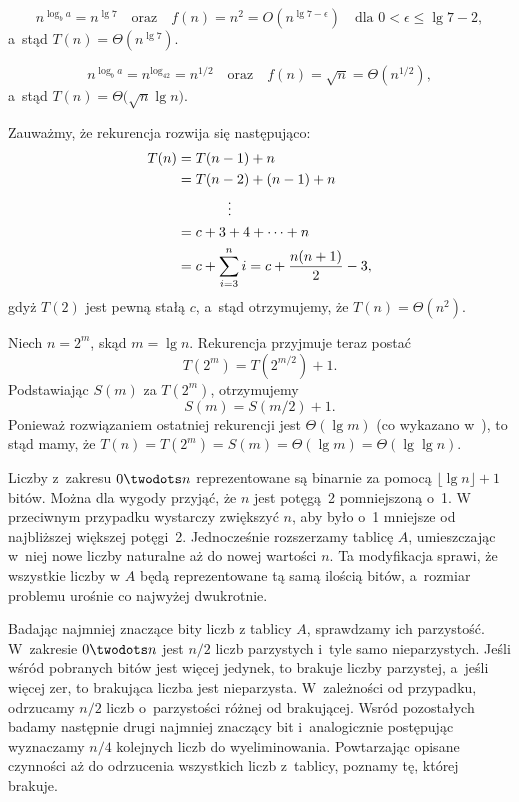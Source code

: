 \subproblem %
\[
	n^{\log_ba} = n^{\lg7} \quad\text{oraz}\quad f(n) = n^2 = O(n^{\lg7-\epsilon}) \quad\text{dla $0<\epsilon\le\lg7-2$},
\]
a~stąd $T(n)=\Theta(n^{\lg7})$.

\subproblem %
\[
	n^{\log_ba} = n^{\log_42} = n^{1/2} \quad\text{oraz}\quad f(n) = \sqrt{n} = \Theta(n^{1/2}),
\]
a~stąd $T(n)=\Theta\bigl(\!\sqrt{n}\lg n\bigr)$.

\subproblem %
Zauważmy, że rekurencja rozwija się następująco:
\begin{align*}
	T(n) &= T(n-1)+n \\
	&= T(n-2)+(n-1)+n \\
	&\hspace{.5in}\vdots \\
	&= c+3+4+\cdots+n \\
	&= c+\sum_{i=3}^ni = c+\frac{n(n+1)}{2}-3,
\end{align*}
gdyż $T(2)$ jest pewną stałą $c$, a~stąd otrzymujemy, że $T(n)=\Theta(n^2)$.

\subproblem %
Niech $n=2^m$, skąd $m=\lg n$. Rekurencja przyjmuje teraz postać
\[
	T(2^m) = T(2^{m/2})+1.
\]
Podstawiając $S(m)$ za $T(2^m)$, otrzymujemy
\[
	S(m) = S(m/2)+1.
\]
Ponieważ rozwiązaniem ostatniej rekurencji jest $\Theta(\lg m)$ (co wykazano w~), to stąd mamy, że $T(n)=T(2^m)=S(m)=\Theta(\lg m)=\Theta(\lg\lg n)$.

Liczby z~zakresu $0\twodots n$ reprezentowane są binarnie za pomocą $\lfloor\lg n\rfloor+1$ bitów. Można dla wygody przyjąć, że $n$ jest potęgą~2 pomniejszoną o~1. W przeciwnym przypadku wystarczy zwiększyć $n$, aby było o~1 mniejsze od najbliższej większej potęgi~2. Jednocześnie rozszerzamy tablicę $A$, umieszczając w~niej nowe liczby naturalne aż do nowej wartości $n$. Ta modyfikacja sprawi, że wszystkie liczby w $A$ będą reprezentowane tą samą ilością bitów, a~rozmiar problemu urośnie co najwyżej dwukrotnie.

Badając najmniej znaczące bity liczb z tablicy $A$, sprawdzamy ich parzystość. W~zakresie $0\twodots n$ jest $n/2$ liczb parzystych i~tyle samo nieparzystych. Jeśli wśród pobranych bitów jest więcej jedynek, to brakuje liczby parzystej, a~jeśli więcej zer, to brakująca liczba jest nieparzysta. W~zależności od przypadku, odrzucamy $n/2$ liczb o~parzystości różnej od brakującej. Wsród pozostałych badamy następnie drugi najmniej znaczący bit i~analogicznie postępując wyznaczamy $n/4$ kolejnych liczb do wyeliminowania. Powtarzając opisane czynności aż do odrzucenia wszystkich liczb z~tablicy, poznamy tę, której brakuje.

